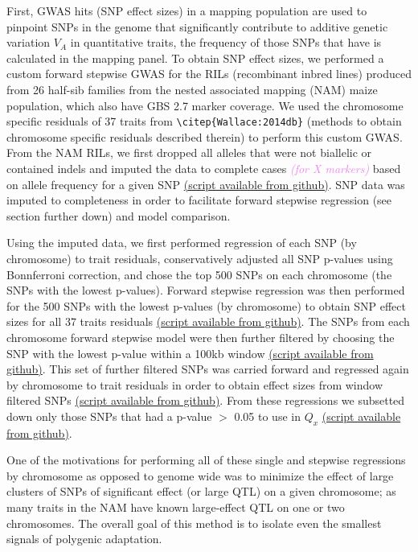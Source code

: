 \documentclass[9pt,twocolumn,twoside]{gsajnl}
\newcommand{\kc}[1]{\textcolor{violet}{ \emph{ #1}} }
\begin{document}
First, GWAS hits (SNP effect sizes) in a mapping population are used to pinpoint SNPs in the genome that significantly contribute to additive genetic variation $V_A$ in quantitative traits, the frequency of those SNPs that have is calculated in the mapping panel. 
To obtain SNP effect sizes, we performed a custom forward stepwise GWAS for the RILs (recombinant inbred lines) produced from 26 half-sib families from the nested associated mapping (NAM) maize population, which also have GBS 2.7 marker coverage.
We used the chromosome specific residuals of 37 traits from \verb|\citep{Wallace:2014db}| (methods to obtain chromosome specific residuals described therein) to perform this custom GWAS. 
From the NAM RILs, we first dropped all alleles that were not biallelic or contained indels and imputed the data to complete cases \kc{(for X markers)} based on allele frequency for a given SNP \href{https://github.com/RILAB/historical_genomics/blob/master/scripts/bulk_imputation_script1.R}{(script available from github)}. 
SNP data was imputed to completeness in order to facilitate forward stepwise regression (see section further down) and model comparison.  

Using the imputed data, we first performed regression of each SNP (by chromosome) to trait residuals, conservatively adjusted all SNP p-values using Bonnferroni correction, and chose the top 500 SNPs on each chromosome (the SNPs with the lowest p-values). 
Forward stepwise regression was then performed for the 500 SNPs with the lowest p-values (by chromosome) to obtain SNP effect sizes for all 37 traits residuals \href{https://github.com/RILAB/historical_genomics/blob/master/scripts/single_step_NAM_script_2.R}{(script available from github)}. 
The SNPs from each chromosome forward stepwise model were then further filtered by choosing the SNP with the lowest p-value within a 100kb window \href{https://github.com/RILAB/historical_genomics/blob/master/scripts/filter_snp_effects_script_3.R}{(script available from github)}. 
This set of further filtered SNPs was carried forward and regressed again by chromosome to trait residuals in order to obtain effect sizes from window filtered SNPs \href{https://github.com/RILAB/historical_genomics/blob/master/scripts/final_effects_script_4.R}{(script available from github)}. 
From these regressions we subsetted down only those SNPs that had a p-value $>$ 0.05 to use in $Q_x$ \href{https://github.com/RILAB/historical_genomics/blob/master/scripts/script5.R}{(script available from github)}.

One of the motivations for performing all of these single and stepwise regressions by chromosome as opposed to genome wide was to minimize the effect of large clusters of SNPs of significant effect (or large QTL) on a given chromosome; as many traits in the NAM have known large-effect QTL on one or two chromosomes. The overall goal of this method is to isolate even the smallest signals of polygenic adaptation. 
\end{document}
